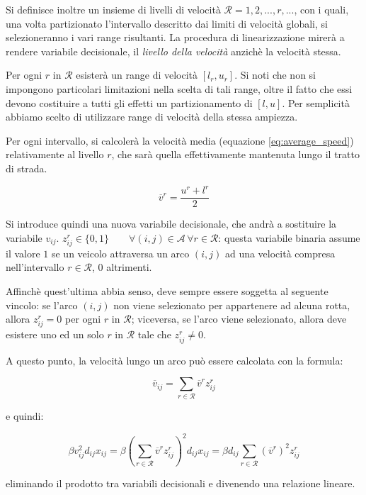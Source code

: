 	Si definisce inoltre un insieme di livelli di velocità $\mathcal{R} = {1,2,...,r,...}$, con i quali, una volta partizionato l’intervallo descritto dai limiti di velocità globali, si selezioneranno i vari range risultanti. La procedura di linearizzazione mirerà a rendere variabile decisionale, il \emph{livello della velocità} anzichè la velocità stessa.
			
	Per ogni $r$ in $\mathcal{R}$ esisterà un range di velocità $[l_r, u_r]$. Si noti che non si impongono particolari limitazioni nella scelta di tali range, oltre il fatto che essi devono costituire a tutti gli effetti un partizionamento di $[l, u]$. Per semplicità abbiamo scelto di utilizzare range di velocità della stessa ampiezza.

	Per ogni intervallo, si calcolerà la velocità media (equazione \ref{eq:average_speed}) relativamente al livello $r$, che sarà quella effettivamente mantenuta lungo il tratto di strada.

	\begin{equation}
		\label{eq:average_speed}
		\overline v ^ r = \frac{u^r + l^r}{2}
	\end{equation}

	Si introduce quindi una nuova variabile decisionale, che andrà a sostituire la variabile $v_{ij}$.
	$z_{ij}^{r} \in \{0,1\} \qquad \forall (i,j) \in \mathcal{A} \, \forall r \in \mathcal{R}$: questa variabile binaria assume il valore $1$ se un veicolo attraversa un arco $(i,j)$ ad una velocità compresa nell’intervallo $r \in \mathcal{R}$, $0$ altrimenti.

	Affinchè quest’ultima abbia senso, deve sempre essere soggetta al seguente vincolo: se l’arco $(i,j)$ non viene selezionato per appartenere ad alcuna rotta, allora $z_{ij}^r = 0$ per ogni $r$ in $\mathcal{R}$; viceversa, se l’arco viene selezionato, allora deve esistere uno ed un solo $r$ in $\mathcal{R}$ tale che $z_{ij}^r \neq 0$.

	A questo punto, la velocità lungo un arco può essere calcolata con la formula:

	$$\overline v_{ij} = \sum_{r \in \mathcal{R}} \overline v^r z_{ij}^r $$

	e quindi:

	$$\beta v_{ij}^2 d_{ij} x_{ij} = 
		\beta \left(\sum_{r \in \mathcal{R}} \overline v^r z_{ij}^r \right)^2 d_{ij} x_{ij} = 
		\beta d_{ij} \sum_{r \in \mathcal{R}} (\overline v^r)^2 z_{ij}^r
	$$

	eliminando il prodotto tra variabili decisionali e divenendo una relazione lineare.

